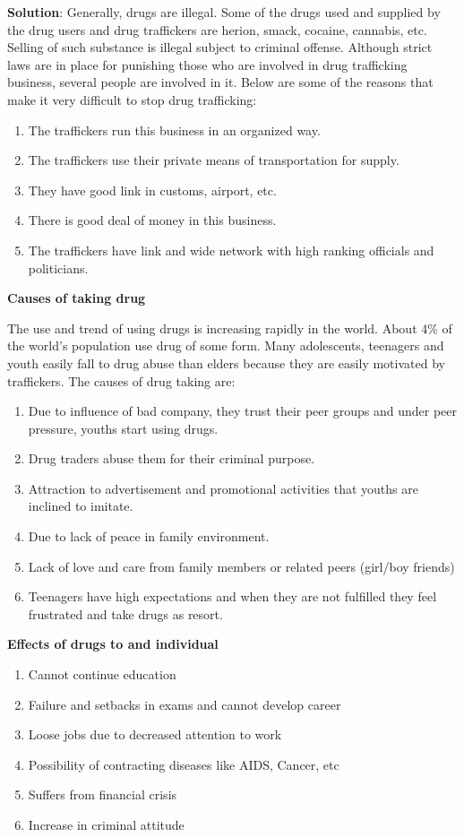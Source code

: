\documentclass[
  openany]{book}
\newenvironment{solution}{ {\bfseries Solution}:}{}
\begin{document}
\begin{questions}
\begin{solution}
Generally, drugs are illegal. Some of the drugs used and supplied by the drug users and drug traffickers are herion, smack, cocaine, cannabis, etc. Selling of such substance is illegal subject to criminal offense. Although strict laws are in place for punishing those who are involved in drug trafficking business, several people are involved in it. Below are some of the reasons that make it very difficult to stop drug trafficking:

\begin{enumerate}
\item The traffickers run this business in an organized way.
\item The traffickers use their private means of transportation for supply.
\item They have good link in customs, airport, etc.
\item There is good deal of money in this business.
\item The traffickers have link and wide network with high ranking officials and politicians.
\end{enumerate}

\textbf{Causes of taking drug}

The use and trend of using drugs is increasing rapidly in the world. About 4\% of the world's population use drug of some form. Many adolescents, teenagers and youth easily fall to drug abuse than elders because they are easily motivated by traffickers. The causes of drug taking are:
\begin{enumerate}
\item Due to influence of bad company, they trust their peer groups and under peer pressure, youths start using drugs.
\item Drug traders abuse them for their criminal purpose.
\item Attraction to advertisement and promotional activities that youths are inclined to imitate.
\item Due to lack of peace in family environment.
\item Lack of love and care from family members or related peers (girl/boy friends)
\item Teenagers have high expectations and when they are not fulfilled they feel frustrated and take drugs as resort.
\end{enumerate}

\textbf{Effects of drugs to and individual}
\begin{enumerate}
\item Cannot continue education
\item Failure and setbacks in exams and cannot develop career
\item Loose jobs due to decreased attention to work
\item Possibility of contracting diseases like AIDS, Cancer, etc
\item Suffers from financial crisis
\item Increase in criminal attitude
\end{enumerate}


\end{solution}
\end{questions}
\end{document}
